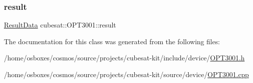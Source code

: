 \mbox{\label{classcubesat_1_1OPT3001_a7eee3af72ef6914189ba433416388a8f}} 
\subsubsection{\texorpdfstring{result}{result}}
{\footnotesize\ttfamily \hyperlink{unioncubesat_1_1OPT3001_1_1ResultData}{Result\+Data} cubesat\+::\+O\+P\+T3001\+::result\hspace{0.3cm}{\ttfamily [private]}}



The documentation for this class was generated from the following files\+:\begin{DoxyCompactItemize}
\item 
/home/osboxes/cosmos/source/projects/cubesat-\/kit/include/device/\hyperlink{OPT3001_8h}{O\+P\+T3001.\+h}\item 
/home/osboxes/cosmos/source/projects/cubesat-\/kit/source/device/\hyperlink{OPT3001_8cpp}{O\+P\+T3001.\+cpp}\end{DoxyCompactItemize}
